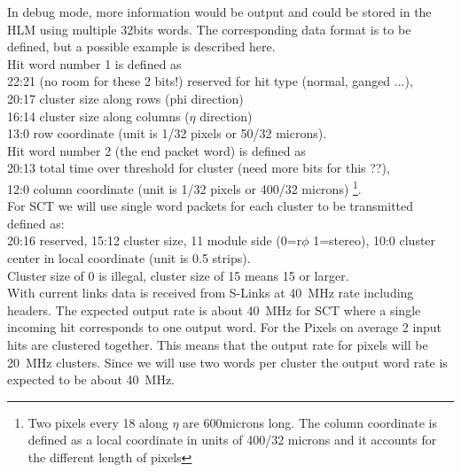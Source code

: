 \documentclass[10pt]{article}
\numberwithin{figure}{section}
\numberwithin{equation}{section}
\numberwithin{table}{section}
\newcommand{\0}{\phantom{0}}
\begin{document}
In debug mode, more information would be output and could be stored in the HLM using multiple 32bits words.
The corresponding data format is to be defined, but a possible example is described here. \\
Hit word number 1 is defined as \\
22:21 (no room for these 2 bits!) reserved for hit type (normal, ganged ...), \\
20:17 cluster size along rows (phi direction) \\
16:14 cluster size along columns ($\eta$ direction) \\
13:0 row coordinate      (unit is 1/32 pixels or 50/32 microns). \\
Hit word number 2 (the end packet word) is defined as \\
20:13 total time over threshold for cluster (need more bits for this ??), \\
12:0 column coordinate (unit is 1/32 pixels or 400/32 microns) \footnote{Two pixels every 18 along $\eta$ are 600microns long. The column coordinate is defined as a local coordinate in units of 400/32 microns and it accounts for the different length of pixels}. \\

For SCT we will use single word packets for each cluster to be transmitted defined as: \\
20:16 reserved,  15:12 cluster size, 11 module side (0=r$\phi$ 1=stereo), 10:0 cluster center in local coordinate       (unit is 0.5 strips).\\
Cluster size of 0 is illegal,  cluster size of 15 means 15 or larger. \\


With current links data is received from S-Links at 40~MHz rate including headers.
The expected output rate is about 40~MHz for SCT where a single incoming hit corresponds to one output word.
For the Pixels on average 2 input hits are clustered together. This means that the output rate for pixels will be 20~MHz clusters.
Since we will use two words per cluster the output word rate is expected to be about 40~MHz.
\end{document}
